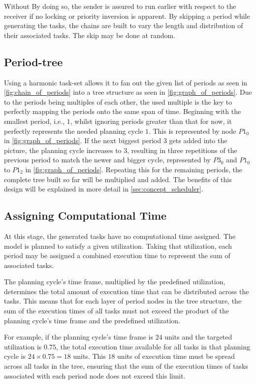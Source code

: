 Without \todo{!} 
By doing so, the sender is assured to run earlier with respect to the receiver if no locking or priority inversion is apparent. 
By skipping a period while generating the tasks, the chains are built to vary the length and distribution of their associated tasks.
The skip may be done at random.

\subsection{Period-tree}\label{sec:period_tree}
Using a harmonic task-set allows it to fan out the given list of periods as seen in \cref{fig:chain_of_periods} into a tree structure as seen in \cref{fig:graph_of_periods}.
Due to the periods being multiples of each other, the used multiple is the key to perfectly mapping the periods onto the same span of time.
Beginning with the smallest period, i.e., $1$, whilst ignoring periods greater than that for now, it perfectly represents the needed planning cycle $1$.
This is represented by node $P1_0$ in \cref{fig:graph_of_periods}.
If the next biggest period $3$ gets added into the picture, the planning cycle increases to $3$, resulting in three repetitions of the previous period to match the newer and bigger cycle, represented by $P3_0$ and $P1_0$ to $P1_2$ in \cref{fig:graph_of_periods}.
Repeating this for the remaining periods, the complete tree built so far will be multiplied and added.
The benefits of this design will be explained in more detail in \cref{sec:concept_scheduler}.

\subsection{Assigning Computational Time}\label{sec:concept_load_spread}
At this stage, the generated tasks have no computational time assigned.
The model is planned to satisfy a given utilization.
Taking that utilization, each period may be assigned a combined execution time to represent the sum of associated tasks.

The planning cycle's time frame, multiplied by the predefined utilization, determines the total amount of execution time that can be distributed across the tasks.
This means that for each layer of period nodes in the tree structure, the sum of the execution times of all tasks must not exceed the product of the planning cycle's time frame and the predefined utilization.

For example, if the planning cycle's time frame is $24$ units and the targeted utilization is $0.75$, the total execution time available for all tasks in that planning cycle is \(24 \times 0.75 = 18\) units.
This $18$ units of execution time must be spread across all tasks in the tree, ensuring that the sum of the execution times of tasks associated with each period node does not exceed this limit.

